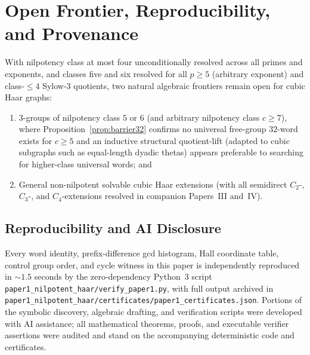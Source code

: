 \documentclass[11pt]{amsart}
\theoremstyle{definition}
\theoremstyle{remark}
\begin{document}
\section{Open Frontier, Reproducibility, and Provenance}

With nilpotency class at most four unconditionally resolved across all primes and exponents, and classes five and six resolved for all $p \ge 5$ (arbitrary exponent) and class-$\le 4$ Sylow-$3$ quotients, two natural algebraic frontiers remain open for cubic Haar graphs:
\begin{enumerate}
\item $3$-groups of nilpotency class $5$ or $6$ (and arbitrary nilpotency class $c \ge 7$), where Proposition~\ref{prop:barrier32} confirms no universal free-group $32$-word exists for $c \ge 5$ and an inductive structural quotient-lift (adapted to cubic subgraphs such as equal-length dyadic thetas) appears preferable to searching for higher-class universal words; and
\item General non-nilpotent solvable cubic Haar extensions (with all semidirect $C_2$-, $C_3$-, and $C_4$-extensions resolved in companion Papers~III and~IV).
\end{enumerate}

\subsection*{Reproducibility and AI Disclosure}
Every word identity, prefix-difference gcd histogram, Hall coordinate table, control group order, and cycle witness in this paper is independently reproduced in $\sim 1.5$ seconds by the zero-dependency Python~3 script \texttt{paper1\_nilpotent\_haar/verify\_paper1.py}, with full output archived in \texttt{paper1\_nilpotent\_haar/certificates/paper1\_certificates.json}. Portions of the symbolic discovery, algebraic drafting, and verification scripts were developed with AI assistance; all mathematical theorems, proofs, and executable verifier assertions were audited and stand on the accompanying deterministic code and certificates.
\end{document}
